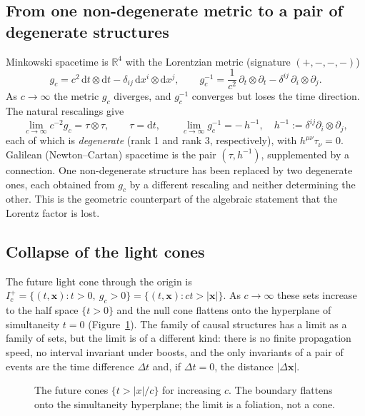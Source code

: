 \documentclass[11pt,a4paper]{article}
\newcommand{\dd}{\mathrm{d}}
\newcommand{\R}{\mathbb{R}}
\newcommand{\bx}{\mathbf{x}}
\theoremstyle{plain}
\theoremstyle{definition}
\theoremstyle{remark}
\begin{document}
\subsection{From one non-degenerate metric to a pair of degenerate structures}
Minkowski spacetime is $\R^4$ with the Lorentzian metric (signature $(+,-,-,-)$)
\begin{equation}
g_c=c^2\,\dd t\otimes\dd t-\delta_{ij}\,\dd x^i\otimes\dd x^j,
\qquad
g_c^{-1}=\frac1{c^2}\,\partial_t\otimes\partial_t-\delta^{ij}\,\partial_i\otimes\partial_j .
\end{equation}
As $c\to\infty$ the metric $g_c$ diverges, and $g_c^{-1}$ converges but loses the time direction.
The natural rescalings give
\begin{equation}
\lim_{c\to\infty}c^{-2}g_c=\tau\otimes\tau,\qquad \tau=\dd t,
\qquad
\lim_{c\to\infty}g_c^{-1}=-\,h^{-1},\quad h^{-1}:=\delta^{ij}\partial_i\otimes\partial_j ,
\end{equation}
each of which is \emph{degenerate} (rank 1 and rank 3, respectively), with $h^{\mu\nu}\tau_\nu=0$.
Galilean (Newton--Cartan) spacetime \cite{Cartan23,Kunzle72} is the pair $(\tau,h^{-1})$, supplemented
by a connection. One non-degenerate structure has been replaced by two degenerate ones, each
obtained from $g_c$ by a different rescaling and neither determining the other. This is the
geometric counterpart of the algebraic statement that the Lorentz factor is lost.

\subsection{Collapse of the light cones}
The future light cone through the origin is $I^+_c=\{(t,\bx): t>0,\ g_c>0\}=\{(t,\bx): ct>|\bx|\}$. As $c\to\infty$ these sets
increase to the half space $\{t>0\}$ and the null cone flattens onto the hyperplane of simultaneity
$t=0$ (Figure~\ref{fig:cones}). The family of causal structures has a limit as a family of sets, but the
limit is of a different kind: there is no finite propagation speed, no interval invariant under
boosts, and the only invariants of a pair of events are the time difference $\Delta t$ and, if
$\Delta t=0$, the distance $|\Delta\bx|$.

\begin{figure}[ht]
\centering
{}
\caption{The future cones $\{t>|x|/c\}$ for increasing $c$. The boundary flattens onto the
simultaneity hyperplane; the limit is a foliation, not a cone.}\label{fig:cones}
\end{figure}
\end{document}

